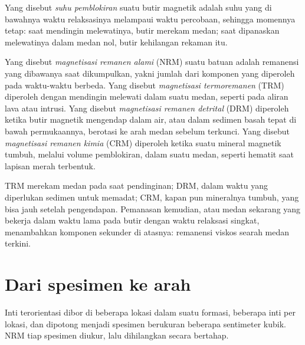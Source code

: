\begin{definition}\label{def:b3:palaeomagnetism:blocking}
Yang disebut \emph{suhu pemblokiran} suatu butir magnetik
adalah suhu yang di bawahnya waktu relaksasinya melampaui waktu
percobaan, sehingga momennya tetap: saat mendingin melewatinya, butir merekam
medan; saat dipanaskan melewatinya dalam medan nol, butir kehilangan
rekaman itu.
\end{definition}

\begin{definition}\label{def:b3:palaeomagnetism:nrm}
Yang disebut \emph{magnetisasi remanen alami}
(NRM) suatu batuan adalah remanensi yang dibawanya saat dikumpulkan, yakni jumlah dari
komponen yang diperoleh pada waktu-waktu berbeda. Yang disebut \emph{magnetisasi
termoremanen} (TRM) diperoleh dengan mendingin
melewati  dalam suatu medan, seperti pada aliran lava atau
intrusi. Yang disebut \emph{magnetisasi remanen detrital}
(DRM) diperoleh ketika butir magnetik mengendap dalam air, atau dalam
sedimen basah tepat di bawah permukaannya, berotasi ke arah medan sebelum
terkunci. Yang disebut \emph{magnetisasi remanen kimia}
(CRM) diperoleh ketika suatu mineral magnetik tumbuh, melalui
volume pemblokiran, dalam suatu medan, seperti hematit saat lapisan merah terbentuk.
\end{definition}

TRM merekam medan pada saat pendinginan; DRM, dalam waktu yang
diperlukan sedimen untuk memadat; CRM, kapan pun mineralnya tumbuh, yang bisa jauh
setelah pengendapan. Pemanasan kemudian, atau medan sekarang yang bekerja dalam waktu lama
pada butir dengan waktu relaksasi singkat, menambahkan komponen sekunder di atasnya:
remanensi viskos searah medan terkini.

\section{Dari spesimen ke arah}

Inti terorientasi dibor di beberapa lokasi dalam suatu formasi, beberapa inti per
lokasi, dan dipotong menjadi spesimen berukuran beberapa sentimeter kubik. NRM tiap
spesimen diukur, lalu dihilangkan secara bertahap.

